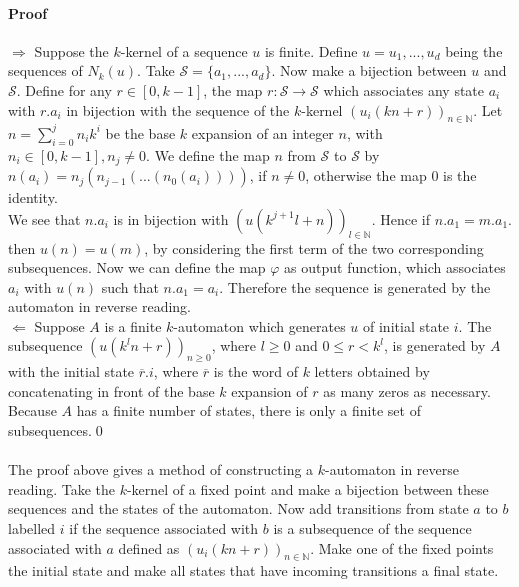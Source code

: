 \documentclass{article}
\begin{document}
\paragraph{Proof} 
$\Rightarrow$ Suppose the $k$-kernel of a sequence $u$ is finite. Define
$u = u_1, ..., u_d$ being the sequences of $N_k(u)$. Take 
$\mathcal{S} = \{a_1, ..., a_d\}$. Now make a bijection between $u$ and 
$\mathcal{S}$. Define for any $r \in [0, k - 1]$, the map 
$r : \mathcal{S} \rightarrow \mathcal{S}$ which associates any state $a_i$ with 
$r.a_i$ in bijection with the sequence of the $k$-kernel 
$(u_i(kn + r))_{n \in \mathbb{N}}$. Let $n = \sum_{i = 0}^j n_i k^i$ be the
base $k$ expansion of an integer $n$, with $n_i \in [0, k - 1], n_j \ne 0$. We
define the map $n$ from $\mathcal{S}$ to $\mathcal{S}$ by 
$n(a_i) = n_j(n_{j - 1}( ... (n_0(a_i))))$, if $n \ne 0$, otherwise the map 0
is the identity.\\
We see that $n.a_i$ is in bijection with 
$(u(k^{j + 1} l + n))_{l \in \mathbb{N}}$. Hence if $n.a_1 = m.a_1$. then 
$u(n) = u(m)$, by considering the first term of the two corresponding
subsequences. Now we can define the map $\varphi$ as output function, which
associates $a_i$ with $u(n)$ such that $n.a_1 = a_i$. Therefore the sequence
is generated by the automaton in reverse reading.\\
$\Leftarrow$ Suppose $A$ is a finite $k$-automaton which generates $u$ of 
initial state $i$. The subsequence $(u(k^ln + r))_{n \ge 0}$, where 
$l \ge 0$ and $0 \le r < k^l$, is generated by $A$ with the initial state 
$\overline{r}.i$, where $\overline{r}$ is the word of $k$ letters obtained 
by concatenating in front of the base $k$ expansion of $r$ as many zeros as 
necessary. Because $A$ has a finite number of states, there is only a finite
set of subsequences.\qed\\
\\
The proof above gives a method of constructing a $k$-automaton in reverse 
reading. Take the $k$-kernel of a fixed point and make a bijection between
these sequences and the states of the automaton. Now add transitions from 
state $a$ to $b$ labelled $i$ if the sequence associated with $b$ is a 
subsequence of the sequence associated with $a$ defined as 
$(u_i(kn + r))_{n \in \mathbb{N}}$. Make one of the fixed points the initial
state and make all states that have incoming transitions a final state.
\end{document}
